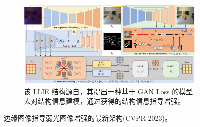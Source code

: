 \documentclass[a4paper, 10pt]{article}
\begin{document}
	\begin{figure}[htb]
		\centering 
		\begin{subfigure}{0.8\columnwidth}
			\includegraphics[width=\columnwidth]{picture/LLIE/Structure Modeling and Guidance/Overview}
			\captionsetup{font=scriptsize}
			\caption{该 LLIE 结构源自\cite{xu2023low}，其提出一种基于 GAN Loss 的模型去对结构信息建模，通过获得的结构信息指导增强。}
			\label{fig: SMG-LLIE Architecture}
		\end{subfigure}
		\caption{
			\label{fig: SMG-LLIE Overview} 
			边缘图像指导弱光图像增强的最新架构(CVPR 2023)。
		}
	\end{figure}
	
\end{document}
